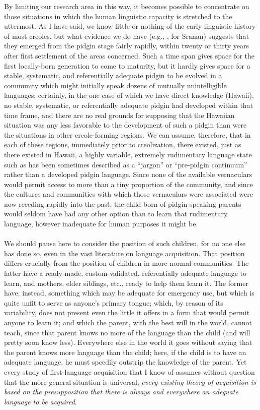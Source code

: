 By limiting our research area in this way, it becomes possible to concentrate on those situations in which the human linguistic capacity is stretched to the uttermost. As I have said, we know little or nothing of the early linguistic history of most creoles, but what evidence we do have (e.g., \citealt{Rens1953}, for Sranan) suggests that they emerged from the pidgin stage fairly rapidly, within twenty or thirty years after first settlement of the areas concerned. Such a time span gives space for the first locally-born generation to come to maturity, but it hardly gives space for a stable, systematic, and referentially adequate pidgin to be evolved in a community which might initially speak dozens of mutually unintelligible languages; certainly, in the one case of which we have direct knowledge (Hawaii), no stable, systematic, or referentially
adequate pidgin had developed within that time frame, and there are no real grounds for supposing that the Hawaiian situation was any less favorable to the development of such a pidgin than were the situations in other creole-forming regions. We can assume, therefore, that in each of these regions, immediately prior to creolization, there existed, just as there existed in Hawaii, a highly variable, extremely rudimentary language state such as has been sometimes described as a ``jargon'' or ``pre-pidgin continuum'' rather than a developed pidgin language. Since none of the available vernaculars would permit access to more than a tiny proportion of the community, and since the cultures and communities with which those vernaculars were associated were now receding rapidly into the past, the child born of pidgin-speaking parents would seldom have had any other option than to learn that rudi\-mentary language, however inadequate for human purposes it might be.\\\\


We should pause here to consider the position of such children, for no one else has done so, even in the vast literature on language acquisition. That position differs crucially from the position of children in more normal communities. The latter have a ready-made, custom-validated, referentially adequate language to learn, and mothers, elder siblings, etc., ready to help them learn it. The former have, instead, something which may be adequate for emergency use, but which is quite unfit to serve as anyone's primary tongue; which, by reason of its variability, does not present even the little it offers in a form that would permit anyone to learn it; and which the parent, with the best will in the world, cannot teach, since that parent knows no more of the language than the child (and will pretty soon know less). Every\-where else in the world it goes without saying that the parent knows more language than the child; here, if the child is to have an adequate language, he must speedily outstrip the knowledge of the parent. Yet every study of first-language acquisition that I know of assumes without question that the more general situation is universal; \textit{every existing theory of acquisition is based on the presupposition that there is always and everywhere an adequate language to be acquired}.

